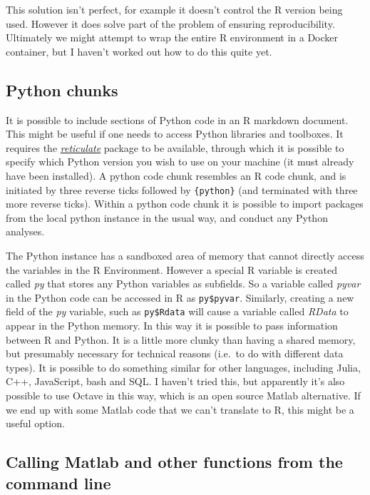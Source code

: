 \documentclass[
]{article}
\begin{document}
This solution isn't perfect, for example it doesn't control the R version being used. However it does solve part of the problem of ensuring reproducibility. Ultimately we might attempt to wrap the entire R environment in a Docker container, but I haven't worked out how to do this quite yet.

\hypertarget{python-chunks}{%
\subsection{Python chunks}\label{python-chunks}}

It is possible to include sections of Python code in an R markdown document. This might be useful if one needs to access Python libraries and toolboxes. It requires the \href{}{\emph{reticulate}} package to be available, through which it is possible to specify which Python version you wish to use on your machine (it must already have been installed). A python code chunk resembles an R code chunk, and is initiated by three reverse ticks followed by \texttt{\{python\}} (and terminated with three more reverse ticks). Within a python code chunk it is possible to import packages from the local python instance in the usual way, and conduct any Python analyses.

The Python instance has a sandboxed area of memory that cannot directly access the variables in the R Environment. However a special R variable is created called \emph{py} that stores any Python variables as subfields. So a variable called \emph{pyvar} in the Python code can be accessed in R as \texttt{py\$pyvar}. Similarly, creating a new field of the \emph{py} variable, such as \texttt{py\$Rdata} will cause a variable called \emph{RData} to appear in the Python memory. In this way it is possible to pass information between R and Python. It is a little more clunky than having a shared memory, but presumably necessary for technical reasons (i.e.~to do with different data types). It is possible to do something similar for other languages, including Julia, C++, JavaScript, bash and SQL. I haven't tried this, but apparently it's also possible to use Octave in this way, which is an open source Matlab alternative. If we end up with some Matlab code that we can't translate to R, this might be a useful option.

\hypertarget{calling-matlab-and-other-functions-from-the-command-line}{%
\subsection{Calling Matlab and other functions from the command line}\label{calling-matlab-and-other-functions-from-the-command-line}}
\end{document}
